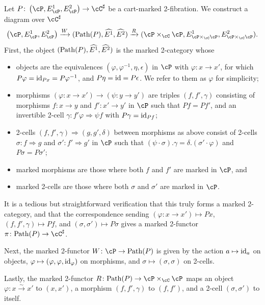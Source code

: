 \documentclass[11pt, dvipsnames]{amsart}
\begin{document}
	\begin{constr}\label{construction:path_object}
	Let $P\colon\markedscat{\cP}\to\cC^\sharp$ be a cart-marked 2-fibration.
	We construct a diagram over $\cC^\sharp$
	\[
	\markedscat{\cP}\xrightarrow{W} (\Path(P),\widehat{E^1},\widehat{E^2})\xrightarrow{R} (\cP\times_{\cC}\cP,E^1_{\cP\times_{\cC}\cP}, E^2_{\cP\times_{\cC}\cP}).
	\]
	First, the object $(\mathrm{Path}(P),\widehat{E^1},\widehat{E^2})$ is the marked 2-category whose
\begin{itemize}[leftmargin=*]
	\item
    objects are the equivalences $(\varphi, \varphi^{-1},\eta,\epsilon)$ in $\cP$  with $\varphi\colon x\to x'$, for which $P\varphi=\mathrm{id}_{Px}=P\varphi^{-1}$, and  $P\eta=\mathrm{id}=P\epsilon$. We refer to them as $\varphi$ for simplicity;
	\item
	 morphisms $(\varphi\colon x\to x')\to (\psi\colon y\to y')$ are triples $(f,f',\gamma)$ consisting of morphisms $f\colon x\to y$ and $f'\colon x'\to y'$ in $\cP$ such that $Pf = Pf'$, and an invertible 2-cell $\gamma\colon f'\varphi \Rightarrow \psi f$ with $P\gamma=\mathrm{id}_{Pf}$;

	\item
	2-cells $(f,f',\gamma)\Rightarrow (g,g',\delta)$ between morphisms as above consist of 2-cells $\sigma\colon f\Rightarrow g$ and $\sigma' \colon f'\Rightarrow g'$ in $\cP$ such that $  (\psi \cdot \sigma). \gamma = \delta.(\sigma' \cdot \varphi)$ and $P\sigma=P\sigma'$; 


	\item
	marked morphisms are those where both $f$ and $f'$ are marked in $\cP$, and
	\item
	marked 2-cells are those where both $\sigma$ and $\sigma'$ are marked in $\cP$.
	\end{itemize}

	It is a tedious but straightforward verification that this truly forms a marked 2-category, and that the correspondence sending $(\varphi\colon x\to x')\mapsto Px$, $(f,f',\gamma)\mapsto Pf$, and $(\sigma,\sigma')\mapsto P\sigma$ gives a marked 2-functor $\pi\colon\Path(P)\to\Csharp$.

	Next, the marked 2-functor $W\colon \cP\to\Path(P)$ is given by the action $a\mapsto \mathrm{id}_a$ on objects, $\varphi \mapsto (\varphi,\varphi,\mathrm{id}_{\varphi})$ on morphisms, and $\sigma \mapsto (\sigma,\sigma)$ on 2-cells. 


	Lastly, the marked 2-functor $R\colon \Path(P)\to\cP\times_{\cC}\cP$ maps an object $\varphi\colon x\xrightarrow{\sim} x'$ to $(x,x')$, a morphism $(f,f',\gamma)$ to $(f,f')$, and a 2-cell $(\sigma,\sigma')$ to itself.
	\end{constr}
	
\end{document}

